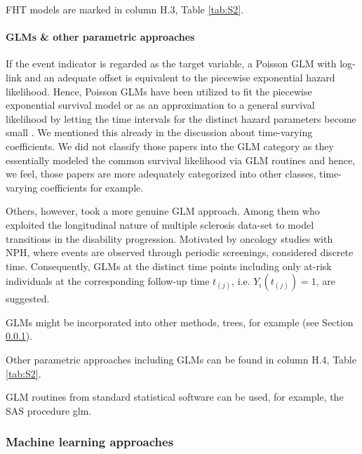 \noindent FHT models are marked in column H.3, Table \ref{tab:S2}.


\paragraph{GLMs \& other parametric approaches} \label{GLM}

\noindent 


\noindent If the event indicator is regarded as the target variable, a Poisson GLM with log-link and an adequate offset is equivalent to the piecewise exponential hazard likelihood. Hence, Poisson GLMs have been utilized to fit the piecewise exponential survival model or as an approximation to a general survival likelihood by letting the time intervals for the distinct hazard parameters become small \cite{Argyropoulos.2015}. We mentioned this already in the discussion about time-varying coefficients. We did not classify those papers into the GLM category as they essentially modeled the common survival likelihood via GLM routines and hence, we feel, those papers are more adequately categorized into other classes, time-varying coefficients for example.

\noindent Others, however, took a more genuine GLM approach. Among them \cite{Mandel.2013} who exploited the longitudinal nature of multiple sclerosis data-set to model transitions in the disability progression. Motivated by oncology studies with NPH, where events are observed through periodic screenings, \cite{Nguyen.2012} considered discrete time. Consequently, GLMs at the distinct time points including only at-risk individuals at the corresponding follow-up time $t_{(j)}$, i.e. $Y_i\left(t_{(j)}\right)=1$,  are suggested. 

\noindent GLMs might be incorporated into other methods, trees, for example (see Section \ref{ML}). 

\noindent Other parametric approaches including GLMs can be found in column H.4, Table \ref{tab:S2}.


\noindent GLM routines from standard statistical software can be used, for example, the SAS procedure glm.

\noindent 


\subsubsection{Machine learning approaches }\label{ML}

